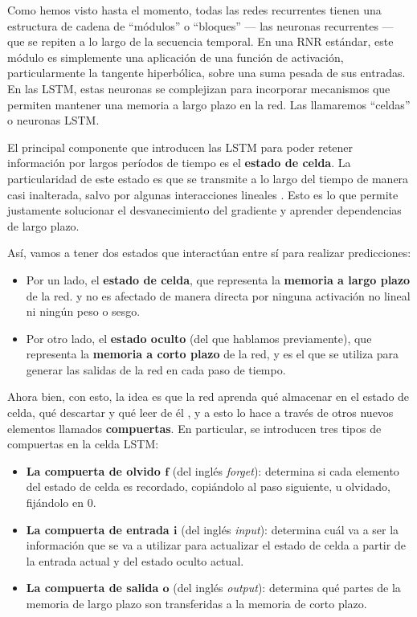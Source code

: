 \documentclass[../../main.tex]{subfiles}
\begin{document}
Como hemos visto hasta el momento, todas las redes recurrentes tienen una estructura de
cadena de ``módulos'' o ``bloques'' \cite{colahs-blog-lstm-2015} — las neuronas
recurrentes — que se repiten a lo largo de la secuencia temporal. En una RNR estándar,
este módulo es simplemente una aplicación de una función de activación, particularmente la
tangente hiperbólica, sobre una suma pesada de sus entradas. En las LSTM, estas neuronas
se complejizan para incorporar mecanismos que permiten mantener una memoria a largo plazo
en la red. Las llamaremos ``celdas'' o neuronas LSTM.

El principal componente que introducen las LSTM para poder retener información por largos
períodos de tiempo es el \textbf{estado de celda}. La particularidad de este estado es que
se transmite a lo largo del tiempo de manera casi inalterada, salvo por algunas
interacciones lineales \cite{colahs-blog-lstm-2015} \cite{ai-a-modern-approach}. Esto es
lo que permite justamente solucionar el desvanecimiento del gradiente y aprender
dependencias de largo plazo.

Así, vamos a tener dos estados que interactúan entre sí para realizar predicciones:
\begin{itemize}
    \item Por un lado, el \textbf{estado de celda}, que representa la \textbf{memoria a
    largo plazo} de la red. y no es afectado de manera directa por ninguna activación no
    lineal ni ningún peso o sesgo.
    \item Por otro lado, el \textbf{estado oculto} (del que hablamos previamente), que
    representa la \textbf{memoria a corto plazo} de la red, y es el que se utiliza para
    generar las salidas de la red en cada paso de tiempo.
\end{itemize}

Ahora bien, con esto, la idea es que la red aprenda qué almacenar en el estado de celda,
qué descartar y qué leer de él \cite{hands-on-ML-sklearn-tf}, y a esto lo hace a través de
otros nuevos elementos llamados \textbf{compuertas}. En particular, se introducen tres
tipos de compuertas en la celda LSTM:
\begin{itemize}
    \item \textbf{La compuerta de olvido \(\bm{f}\)} (del inglés \textit{forget}):
    determina si cada elemento del estado de celda es recordado, copiándolo al paso
    siguiente, u olvidado, fijándolo en 0.
    \item \textbf{La compuerta de entrada \(\bm{i}\)} (del inglés \textit{input}):
    determina cuál va a ser la información que se va a utilizar para actualizar
    el estado de celda a partir de la entrada actual y del estado oculto actual.
    \item \textbf{La compuerta de salida \(\bm{o}\)} (del inglés \textit{output}):
    determina qué partes de la memoria de largo plazo son transferidas a la memoria
    de corto plazo.
\end{itemize}
\end{document}
